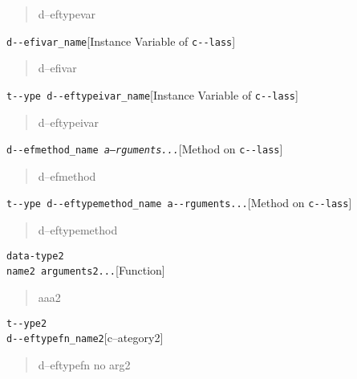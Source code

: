 \documentclass{book}
\begin{document}
\begin{titlepage}
%
\begin{quote}
d--eftypevar
\end{quote}

\noindent\texttt{d{-}{-}efivar\_name}\hfill[Instance Variable of \texttt{c{-}{-}lass}]



%
\begin{quote}
d--efivar
\end{quote}

\noindent\texttt{t{-}{-}ype d{-}{-}eftypeivar\_name}\hfill[Instance Variable of \texttt{c{-}{-}lass}]



%
\begin{quote}
d--eftypeivar
\end{quote}

\noindent\texttt{d{-}{-}efmethod\_name \EmbracOn{}\textnormal{\textsl{a--rguments...}}\EmbracOff{}}\hfill[Method on \texttt{c{-}{-}lass}]



%
\begin{quote}
d--efmethod
\end{quote}

\noindent\texttt{t{-}{-}ype d{-}{-}eftypemethod\_name a{-}{-}rguments...}\hfill[Method on \texttt{c{-}{-}lass}]



%
\begin{quote}
d--eftypemethod
\end{quote}


\noindent\texttt{data-type2\leavevmode{}\\name2 arguments2...}\hfill[Function]



%
\begin{quote}
aaa2
\end{quote}

\noindent\texttt{t{-}{-}ype2\leavevmode{}\\d{-}{-}eftypefn\_name2}\hfill[c--ategory2]



%
\begin{quote}
d--eftypefn no arg2
\end{quote}


\end{titlepage}
\end{document}
